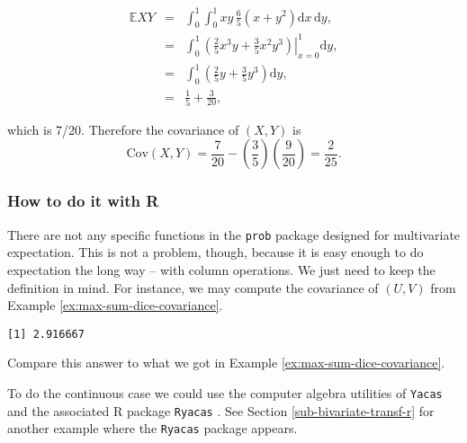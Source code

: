 \documentclass[]{book}
\newenvironment{Shaded}{\begin{snugshade}}{\end{snugshade}}
\newcommand{\KeywordTok}[1]{\textcolor[rgb]{0.13,0.29,0.53}{\textbf{{#1}}}}
\newcommand{\StringTok}[1]{\textcolor[rgb]{0.31,0.60,0.02}{{#1}}}
\newcommand{\NormalTok}[1]{{#1}}
\numberwithin{equation}{chapter}
\numberwithin{figure}{chapter}
\theoremstyle{plain}
\theoremstyle{definition}
\theoremstyle{remark}
\theoremstyle{definition}
\theoremstyle{definition}
\theoremstyle{remark}
\begin{document}
\begin{eqnarray*}
\mathbb{E} XY & = & \int_{0}^{1}\int_{0}^{1}xy\,\frac{6}{5}\left(x+y^{2}\right)\mathrm{d} x\,\mathrm{d} y,\\
 & = & \int_{0}^{1}\left.\left(\frac{2}{5}x^{3}y+\frac{3}{5}x^{2}y^{3}\right)\right|_{x=0}^{1}\mathrm{d} y,\\
 & = & \int_{0}^{1}\left(\frac{2}{5}y+\frac{3}{5}y^{3}\right)\mathrm{d} y,\\
 & = & \frac{1}{5}+\frac{3}{20},
\end{eqnarray*}

which is 7/20. Therefore the covariance of \((X,Y)\) is \[
\mbox{Cov}(X,Y)=\frac{7}{20}-\left(\frac{3}{5}\right)\left(\frac{9}{20}\right)=\frac{2}{25}.
\]

\subsubsection{How to do it with R}\label{how-to-do-it-with-r-29}

There are not any specific functions in the \texttt{prob} package
\autocite{prob} designed for multivariate expectation. This is not a
problem, though, because it is easy enough to do expectation the long
way -- with column operations. We just need to keep the definition in
mind. For instance, we may compute the covariance of \((U,V)\) from
Example \ref{ex:max-sum-dice-covariance}.

\begin{Shaded}
\end{Shaded}

\begin{verbatim}
[1] 2.916667
\end{verbatim}

Compare this answer to what we got in Example
\ref{ex:max-sum-dice-covariance}.

To do the continuous case we could use the computer algebra utilities of
\texttt{Yacas} and the associated R package \texttt{Ryacas}
\autocite{Ryacas}. See Section \ref{sub-bivariate-transf-r} for another
example where the \texttt{Ryacas} package appears.
\end{document}
